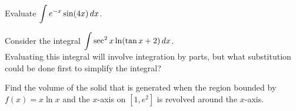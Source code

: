 \documentclass[12pt]{article}
\begin{document}
\vfill

\newpage

\Example Evaluate $\displaystyle\int e^{-x}\sin(4x)\,dx$.

\vfill

\Example Consider the integral $\displaystyle\int\sec^2 x\ln(\tan x+2)\,dx$. \\

Evaluating this integral will involve integration by parts, but what substitution could be done first to simplify the integral?

\vspace{40mm}
\newpage

\Example Find the volume of the solid that is generated when the region bounded by $f(x)=x\ln x$ and the $x$-axis on $\left[1,e^2\right]$ is revolved around the $x$-axis.

\vspace{5mm}

\end{document}
